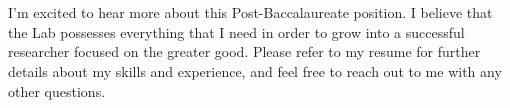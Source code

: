 \\\\
I'm excited to hear more about this Post-Baccalaureate position. I believe
that the Lab possesses everything that I need in order to grow into a 
successful researcher focused on the greater good. Please refer to my 
resume for further details about my skills and experience, and feel free
to reach out to me with any other questions.
